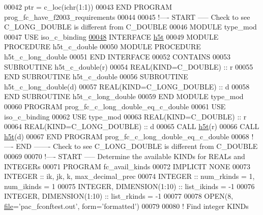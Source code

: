 \begin{DoxyCode}
00042   ptr = c\_loc(ichr(1:1))
00043 \textcolor{keyword}{END PROGRAM }prog\_fc\_have\_f2003\_requirements
00044 
00045 \textcolor{comment}{!---- START ----- Check to see C\_LONG\_DOUBLE is different from C\_DOUBLE}
00046 \textcolor{keyword}{MODULE} type\_mod
00047   \textcolor{keywordtype}{USE }iso\_c\_binding
\hyperlink{interfacetype__mod_1_1h5t}{00048}   \textcolor{keyword}{INTERFACE} \hyperlink{interfacetype__mod_1_1h5t}{h5t}  
00049      \textcolor{keyword}{MODULE PROCEDURE} h5t\_c\_double
00050      \textcolor{keyword}{MODULE PROCEDURE} h5t\_c\_long\_double
00051 \textcolor{keyword}{  END INTERFACE}
00052 \textcolor{keyword}{CONTAINS}
00053 \textcolor{keyword}{  SUBROUTINE }h5t\_c\_double(r)
00054     \textcolor{keywordtype}{REAL(KIND=C\_DOUBLE)} :: r
00055 \textcolor{keyword}{  END SUBROUTINE }h5t\_c\_double
00056 \textcolor{keyword}{  SUBROUTINE }h5t\_c\_long\_double(d)
00057     \textcolor{keywordtype}{REAL(KIND=C\_LONG\_DOUBLE)} :: d
00058 \textcolor{keyword}{  END SUBROUTINE }h5t\_c\_long\_double
00059 \textcolor{keyword}{END MODULE }type\_mod
00060 \textcolor{keyword}{PROGRAM} prog\_fc\_c\_long\_double\_eq\_c\_double
00061   \textcolor{keywordtype}{USE }iso\_c\_binding
00062   \textcolor{keywordtype}{USE }type\_mod
00063   \textcolor{keywordtype}{REAL(KIND=C\_DOUBLE)}      :: r
00064   \textcolor{keywordtype}{REAL(KIND=C\_LONG\_DOUBLE)} :: d
00065   \textcolor{keyword}{CALL }\hyperlink{interfacetype__mod_1_1h5t}{h5t}(r)
00066   \textcolor{keyword}{CALL }\hyperlink{interfacetype__mod_1_1h5t}{h5t}(d)
00067 \textcolor{keyword}{END PROGRAM }prog\_fc\_c\_long\_double\_eq\_c\_double
00068 \textcolor{comment}{!---- END ------- Check to see C\_LONG\_DOUBLE is different from C\_DOUBLE}
00069 
00070 \textcolor{comment}{!---- START ----- Determine the available KINDs for REALs and INTEGERs}
00071 \textcolor{keyword}{PROGRAM} fc\_avail\_kinds
00072       \textcolor{keywordtype}{IMPLICIT NONE}
00073       \textcolor{keywordtype}{INTEGER} :: ik, jk, k, max\_decimal\_prec
00074       \textcolor{keywordtype}{INTEGER} :: num\_rkinds = 1, num\_ikinds = 1
00075       \textcolor{keywordtype}{INTEGER}, \textcolor{keywordtype}{DIMENSION(1:10)} :: list\_ikinds = -1
00076       \textcolor{keywordtype}{INTEGER}, \textcolor{keywordtype}{DIMENSION(1:10)} :: list\_rkinds = -1
00077   
00078       \textcolor{keyword}{OPEN}(8, \hyperlink{structfile}{file}=\textcolor{stringliteral}{'pac\_fconftest.out'}, form=\textcolor{stringliteral}{'formatted'})
00079 
00080       \textcolor{comment}{! Find integer KINDs}

\end{DoxyCode}

